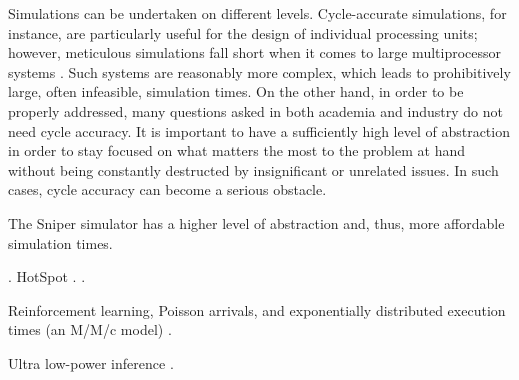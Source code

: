 Simulations can be undertaken on different levels. Cycle-accurate simulations,
for instance, are particularly useful for the design of individual processing
units; however, meticulous simulations fall short when it comes to large
multiprocessor systems \cite{carlson2011}. Such systems are reasonably more
complex, which leads to prohibitively large, often infeasible, simulation times.
On the other hand, in order to be properly addressed, many questions asked in
both academia and industry do not need cycle accuracy. It is important to have a
sufficiently high level of abstraction in order to stay focused on what matters
the most to the problem at hand without being constantly destructed by
insignificant or unrelated issues. In such cases, cycle accuracy can become a
serious obstacle.

The Sniper simulator has a higher level of abstraction \cite{carlson2011} and,
thus, more affordable simulation times.

 \cite{li2009}.
HotSpot \cite{skadron2004}.
 \cite{sridhar2010}.

Reinforcement learning, Poisson arrivals, and exponentially distributed
execution times (an M/M/c model) \cite{lu2015}.

Ultra low-power inference \cite{park2015}.
